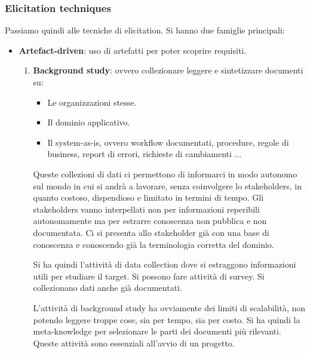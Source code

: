 \subsubsection{Elicitation techniques}
Passiamo quindi alle tecniche di elicitation. Si hanno due famiglie principali:
\begin{itemize}
      \item \textbf{Artefact-driven}: uso di artefatti per poter scoprire requisiti.
            \begin{enumerate}
                  \item \textbf{Background study}: ovvero collezionare leggere
                        e sintetizzare documenti su:
                        \begin{itemize}
                              \item Le organizzazioni stesse.
                              \item Il dominio applicativo.
                              \item Il system-as-is, ovvero workflow documentati,
                                    procedure, regole di business, report di
                                    errori, richieste di cambiamenti $\dots$
                        \end{itemize}
                        Queste collezioni di dati ci permettono di informarci in
                        modo autonomo sul mondo in cui si andrà a lavorare, senza
                        coinvolgere lo stakeholders, in quanto costoso, dispendioso
                        e limitato in termini di tempo. Gli stakeholders vanno
                        interpellati non per informazioni reperibili autonomamente
                        ma per estrarre conoscenza non pubblica e non documentata.
                        Ci si presenta allo stakeholder già con una base di
                        conoscenza e conoscendo già la terminologia corretta del
                        dominio.

                        Si ha quindi l'attività di data collection dove si
                        estraggono informazioni utili per studiare il target. Si
                        possono fare attività di survey. Si collezionano dati anche
                        già documentati.

                        L'attività di background study ha ovviamente dei limiti
                        di scalabilità, non potendo leggere troppe cose, sia per
                        tempo, sia per costo. Si ha quindi la meta-knowledge per
                        selezionare le parti dei documenti più rilevanti.
                        Queste attività sono essenziali all'avvio di un progetto.


\end{enumerate}
\end{itemize}
